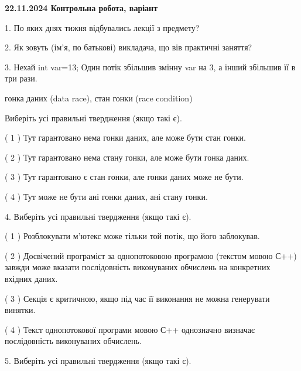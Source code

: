 \documentclass[12pt, ukrainian]{article}
\begin{document}
\vspace{4mm}
\newpage
\begin {large}

\textbf{22.11.2024 Контрольна робота, варіант  }\par


{
1. По яких днях тижня відбувались лекції з предмету?



\vspace{5mm}
2. Як зовуть (ім'я, по батькові) викладача, що вів практичні заняття?



\vspace{5mm}
3. Нехай int var=13; Один потік збільшив змінну var на 3, а інший збільшив її в три рази.

гонка даних (data race), стан гонки (race condition)

Виберіть усі правильні твердження (якщо такі є).\par
\vspace{2mm}
( 1 ) Тут гарантовано нема гонки даних, але може бути стан гонки.%

( 2 ) Тут гарантовано нема стану гонки, але може бути гонка даних.%

( 3 ) Тут гарантовано є стан гонки, але гонки даних може не бути.%

( 4 ) Тут може не бути ані гонки даних, ані стану гонки.%


\vspace{5mm}
4. Виберіть усі правильні твердження (якщо такі є).\par
\vspace{2mm}

( 1 ) Розблокувати м’ютекс може тільки той потік, що його заблокував.%

( 2 ) Досвічений програміст за однопотоковою програмою (текстом мовою С++) завжди може вказати послідовність виконуваних обчислень на конкретних вхідних даних.%

( 3 ) Секція є критичною, якщо під час її виконання не можна генерувати винятки.%

( 4 ) Текст однопотокової програми мовою С++ однозначно визначає послідовність виконуваних обчислень.%


\vspace{5mm}
5. Виберіть усі правильні твердження (якщо такі є).\par
\vspace{2mm}

}
\end{large}
\end{document}
